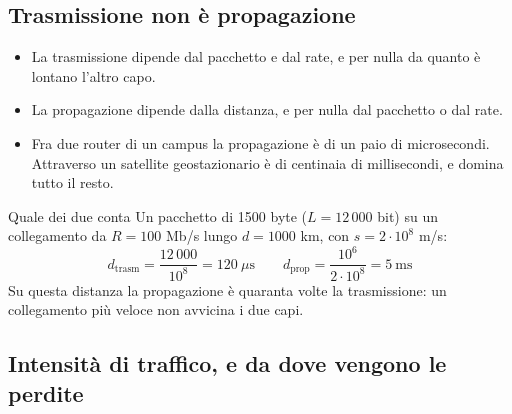 \subsection{Trasmissione non è propagazione}

\begin{itemize}
    \item La trasmissione dipende dal pacchetto e dal rate, e per nulla da quanto è lontano l'altro capo.
    \item La propagazione dipende dalla distanza, e per nulla dal pacchetto o dal rate.
    \item Fra due router di un campus la propagazione è di un paio di microsecondi. Attraverso un satellite
          geostazionario è di centinaia di millisecondi, e domina tutto il resto.
\end{itemize}


\begin{esempio}{Quale dei due conta}
Un pacchetto di 1500 byte ($L = 12\,000$ bit) su un collegamento da $R = 100$ Mb/s lungo $d = 1000$ km, con
$s = 2 \cdot 10^8$ m/s:
\[ d_{\text{trasm}} = \frac{12\,000}{10^8} = 120\ \mu\text{s} \qquad
   d_{\text{prop}} = \frac{10^6}{2\cdot 10^8} = 5\ \text{ms} \]
Su questa distanza la propagazione è quaranta volte la trasmissione: un collegamento più veloce non avvicina i due capi.
\end{esempio}

\subsection{Intensità di traffico, e da dove vengono le perdite}

